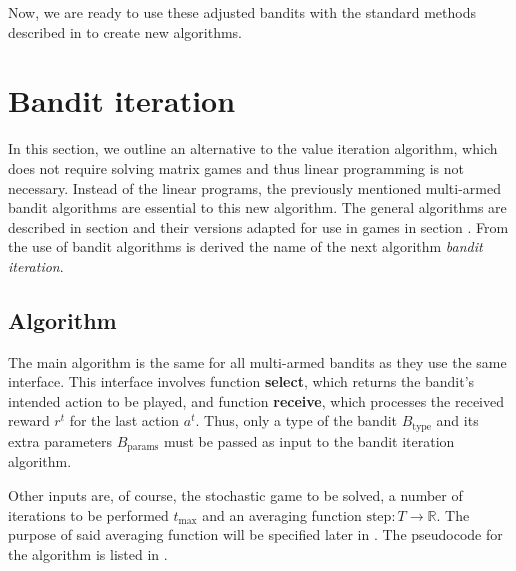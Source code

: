 \documentclass[../main.tex]{subfiles}
\begin{document}
Now, we are ready to use these adjusted bandits with the standard methods described in  to create new algorithms.

\section{Bandit iteration}\label{new:bandititeration}
In this section, we outline an alternative to the value iteration algorithm, which does not require solving matrix games and thus linear programming is not necessary.
Instead of the linear programs, the previously mentioned multi-armed bandit algorithms are essential to this new algorithm.
The general algorithms are described in section  and their versions adapted for use in games in section .
From the use of bandit algorithms is derived the name of the next algorithm \textit{bandit iteration}.

\subsection{Algorithm}\label{new:bandititeration:alg}
The main algorithm is the same for all multi-armed bandits as they use the same interface.
This interface involves function \textbf{select}, which returns the bandit's intended action to be played, and function \textbf{receive}, which processes the received reward $r^t$ for the last action $a^t$.
Thus, only a type of the bandit $B_{\text{type}}$ and its extra parameters $B_{\text{params}}$ must be passed as input to the bandit iteration algorithm.

Other inputs are, of course, the stochastic game to be solved, a number of iterations to be performed $t_{\text{max}}$ and an averaging function $\text{step}: T \to \mathbb{R}$.
The purpose of said averaging function will be specified later in .
The pseudocode for the algorithm is listed in .
\end{document}
